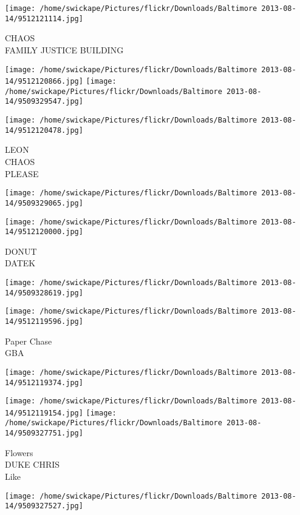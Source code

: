 \documentclass[10pt,letterpaper]{article}
\begin{document}
\vspace{0.25in}
\texttt{[image: /home/swickape/Pictures/flickr/Downloads/Baltimore 2013-08-14/9512121114.jpg]}

CHAOS\\
FAMILY JUSTICE BUILDING
\pagebreak

\texttt{[image: /home/swickape/Pictures/flickr/Downloads/Baltimore 2013-08-14/9512120866.jpg]}
\texttt{[image: /home/swickape/Pictures/flickr/Downloads/Baltimore 2013-08-14/9509329547.jpg]}

\vspace{0.25in}
\texttt{[image: /home/swickape/Pictures/flickr/Downloads/Baltimore 2013-08-14/9512120478.jpg]}

LEON\\
CHAOS\\
PLEASE
\pagebreak

\texttt{[image: /home/swickape/Pictures/flickr/Downloads/Baltimore 2013-08-14/9509329065.jpg]}

\vspace{0.25in}
\texttt{[image: /home/swickape/Pictures/flickr/Downloads/Baltimore 2013-08-14/9512120000.jpg]}

DONUT\\
DATEK
\pagebreak

\texttt{[image: /home/swickape/Pictures/flickr/Downloads/Baltimore 2013-08-14/9509328619.jpg]}

\vspace{0.25in}
\texttt{[image: /home/swickape/Pictures/flickr/Downloads/Baltimore 2013-08-14/9512119596.jpg]}

Paper Chase\\
GBA
\pagebreak

\texttt{[image: /home/swickape/Pictures/flickr/Downloads/Baltimore 2013-08-14/9512119374.jpg]}

\vspace{0.25in}
\texttt{[image: /home/swickape/Pictures/flickr/Downloads/Baltimore 2013-08-14/9512119154.jpg]}
\texttt{[image: /home/swickape/Pictures/flickr/Downloads/Baltimore 2013-08-14/9509327751.jpg]}

Flowers\\
DUKE CHRIS\\
Like
\pagebreak

\texttt{[image: /home/swickape/Pictures/flickr/Downloads/Baltimore 2013-08-14/9509327527.jpg]}
\end{document}
